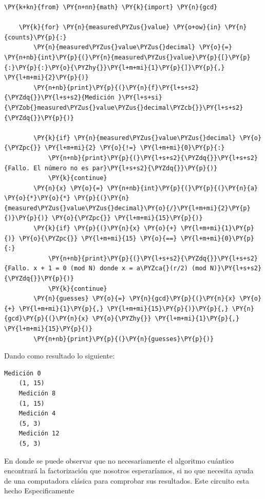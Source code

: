\begin{tcolorbox}[breakable, size=fbox, boxrule=1pt, pad at break*=1mm,colback=cellbackground, colframe=cellborder]
    \begin{Verbatim}[commandchars=\\\{\}]
    \PY{k+kn}{from} \PY{n+nn}{math} \PY{k}{import} \PY{n}{gcd}
    
    \PY{k}{for} \PY{n}{measured\PYZus{}value} \PY{o+ow}{in} \PY{n}{counts}\PY{p}{:}
        \PY{n}{measured\PYZus{}value\PYZus{}decimal} \PY{o}{=} \PY{n+nb}{int}\PY{p}{(}\PY{n}{measured\PYZus{}value}\PY{p}{[}\PY{p}{:}\PY{p}{:}\PY{o}{\PYZhy{}}\PY{l+m+mi}{1}\PY{p}{]}\PY{p}{,} \PY{l+m+mi}{2}\PY{p}{)}
        \PY{n+nb}{print}\PY{p}{(}\PY{n}{f}\PY{l+s+s2}{\PYZdq{}}\PY{l+s+s2}{Medición }\PY{l+s+si}{\PYZob{}measured\PYZus{}value\PYZus{}decimal\PYZcb{}}\PY{l+s+s2}{\PYZdq{}}\PY{p}{)}
        
        \PY{k}{if} \PY{n}{measured\PYZus{}value\PYZus{}decimal} \PY{o}{\PYZpc{}} \PY{l+m+mi}{2} \PY{o}{!=} \PY{l+m+mi}{0}\PY{p}{:}
            \PY{n+nb}{print}\PY{p}{(}\PY{l+s+s2}{\PYZdq{}}\PY{l+s+s2}{Fallo. El número no es par}\PY{l+s+s2}{\PYZdq{}}\PY{p}{)}
            \PY{k}{continue}
        \PY{n}{x} \PY{o}{=} \PY{n+nb}{int}\PY{p}{(}\PY{p}{(}\PY{n}{a} \PY{o}{*}\PY{o}{*} \PY{p}{(}\PY{n}{measured\PYZus{}value\PYZus{}decimal}\PY{o}{/}\PY{l+m+mi}{2}\PY{p}{)}\PY{p}{)} \PY{o}{\PYZpc{}} \PY{l+m+mi}{15}\PY{p}{)}
        \PY{k}{if} \PY{p}{(}\PY{n}{x} \PY{o}{+} \PY{l+m+mi}{1}\PY{p}{)} \PY{o}{\PYZpc{}} \PY{l+m+mi}{15} \PY{o}{==} \PY{l+m+mi}{0}\PY{p}{:}
            \PY{n+nb}{print}\PY{p}{(}\PY{l+s+s2}{\PYZdq{}}\PY{l+s+s2}{Fallo. x + 1 = 0 (mod N) donde x = a\PYZca{}(r/2) (mod N)}\PY{l+s+s2}{\PYZdq{}}\PY{p}{)}
            \PY{k}{continue}
        \PY{n}{guesses} \PY{o}{=} \PY{n}{gcd}\PY{p}{(}\PY{n}{x} \PY{o}{+} \PY{l+m+mi}{1}\PY{p}{,} \PY{l+m+mi}{15}\PY{p}{)}\PY{p}{,} \PY{n}{gcd}\PY{p}{(}\PY{n}{x} \PY{o}{\PYZhy{}} \PY{l+m+mi}{1}\PY{p}{,} \PY{l+m+mi}{15}\PY{p}{)}
        \PY{n+nb}{print}\PY{p}{(}\PY{n}{guesses}\PY{p}{)}
    \end{Verbatim}
    \end{tcolorbox}
Dando como resultado lo siguiente:
        \begin{Verbatim}[commandchars=\\\{\}]
    Medición 0
    (1, 15)
    Medición 8
    (1, 15)
    Medición 4
    (5, 3)
    Medición 12
    (5, 3)
        \end{Verbatim}
En donde se puede observar que no necesariamente el algoritmo cuántico encontrará la factorización que nosotros esperaríamos, si no que necesita ayuda de una computadora clásica para comprobar sus resultados. Este circuito esta hecho Especificamente

